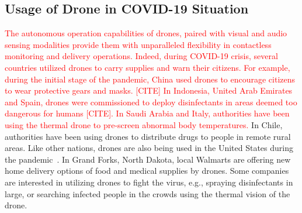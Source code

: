 \subsection{Usage of Drone in COVID-19 Situation}
\textcolor{red}{
The autonomous operation capabilities of drones, paired with visual and audio sensing modalities provide them with unparalleled flexibility in contactless monitoring and delivery operations. Indeed, during COVID-19 crisis, 
}
\textcolor{red}{
several countries utilized drones to carry supplies and warn their citizens. For example, during the initial stage of the pandemic, China used drones to encourage citizens to wear protective gears and masks. [CITE]
In Indonesia, United Arab Emirates and Spain, drones were commissioned to deploy disinfectants in areas deemed too dangerous for humans [CITE].
In Saudi Arabia and Italy, authorities have been using the thermal drone to pre-screen abnormal body temperatures. 
}
In Chile, authorities have been using drones to distribute drugs to people in remote rural areas. Like other nations, drones are also being used in the United States during the pandemic~\cite{dronefortune}. In Grand Forks, North Dakota, local Walmarts are offering new home delivery options of food and medical supplies by drones. Some companies are interested in utilizing drones to fight the virus, e.g., spraying disinfectants in large, or searching infected people in the crowds using the thermal vision of the drone.

